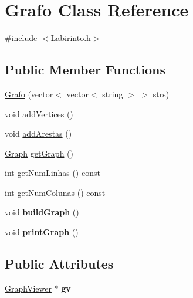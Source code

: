 \hypertarget{class_grafo}{\section{Grafo Class Reference}
\label{class_grafo}
}


{\ttfamily \#include $<$Labirinto.\-h$>$}

\subsection*{Public Member Functions}
\begin{DoxyCompactItemize}
\item 
\hyperlink{class_grafo_aa651adb3f75817afac2ebc7297fe31d6}{Grafo} (vector$<$ vector$<$ string $>$ $>$ strs)
\item 
void \hyperlink{class_grafo_abfb38932d34d944b6ccea411e4e9ad4f}{add\-Vertices} ()
\item 
void \hyperlink{class_grafo_ad2708159daa34a5c69f6b215e1d0c2d0}{add\-Arestas} ()
\item 
\hyperlink{class_graph}{Graph} \hyperlink{class_grafo_a490a64e80fcf4eb72214e82b5bd78461}{get\-Graph} ()
\item 
int \hyperlink{class_grafo_af6d77c535a4d3bd2c8c60c1e61cc94df}{get\-Num\-Linhas} () const 
\item 
int \hyperlink{class_grafo_a5014a92e576aa132ff14788f63cabc31}{get\-Num\-Colunas} () const 
\item 
\hypertarget{class_grafo_ad2c063b568285d687aa1613d1fdd68b0}{void {\bfseries build\-Graph} ()}\label{class_grafo_ad2c063b568285d687aa1613d1fdd68b0}

\item 
\hypertarget{class_grafo_ad1f0e83da29f73fad3562731fb78c070}{void {\bfseries print\-Graph} ()}\label{class_grafo_ad1f0e83da29f73fad3562731fb78c070}

\end{DoxyCompactItemize}
\subsection*{Public Attributes}
\begin{DoxyCompactItemize}
\item 
\hypertarget{class_grafo_a3c5d6d1e6f742ed16a3a3f030f4b5aa4}{\hyperlink{class_graph_viewer}{Graph\-Viewer} $\ast$ {\bfseries gv}}\label{class_grafo_a3c5d6d1e6f742ed16a3a3f030f4b5aa4}

\end{DoxyCompactItemize}


